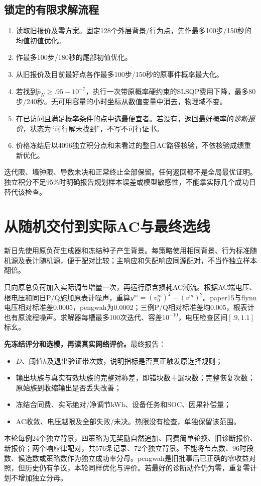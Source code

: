 \documentclass[UTF8,a4paper,11pt]{ctexart}
\begin{document}
\subsection{锁定的有限求解流程}
\begin{enumerate}
 \item 读取旧报价及零方案。固定128个外层背景/行为点，先作最多100步/150秒的均值初值优化。
 \item 作最多100步/180秒的尾部初值优化。
 \item 从旧报价及目前最好点各作最多100步/150秒的原事件概率最大化。
 \item 若找到$\widehat p_N\geq.95-10^{-7}$，执行一次带原概率硬约束的SLSQP费用下降，最多80步/240秒。无可用容量的小时坐标从数值变量中消去，物理域不变。
 \item 在已访问且满足概率条件的点中选最便宜者。若没有，返回最好概率的\emph{诊断报价}，状态为“可行解未找到”，不写不可行证书。
 \item 价格冻结后以4096独立积分点和未看过的整日AC路径核验，不依核验成绩重新优化。
\end{enumerate}
迭代限、墙钟限、导数未决和正常终止全部保留。任何返回都不是全局最优证明。独立积分不足95\%时明确报告规划样本误差或模型敏感性，不能拿实际几个成功日替代该检查。

\section{从随机交付到实际AC与最终选线}
新日先使用原负荷生成器和冻结种子产生背景。每策略使用相同背景、行为标准随机源及表计随机源，便于配对比较；主响应和失配响应同源配对，不当作独立样本翻倍。

只向原总负荷加入实际调节增量一次，再运行原含损耗AC潮流。根据AC端电压、根电压和同日P/Q施加原表计噪声，重算$y^m=(v_0^m)^2-(v^m)^2$。paper15与flynn电压相对标准差0.0005，pengwah为0.0002；三例P/Q相对标准差均0.005，根表计也有原流程噪声。求解器每槽最多100次迭代、容差$10^{-10}$，电压检查区间$[.9,1.1]$标幺。

\textbf{先冻结评分和选模，再读真实网络评价。}最终报告：
\begin{itemize}
 \item $D$、阈值$h$及退出验证带次数，说明指标是否真正触发原选择规则；
 \item 输出块族与真实有效块族的完整对称差，即错块数＋漏块数；完整恢复次数；原始族到收缩输出是否丢失改善；
 \item 冻结合同费、实际绝对/净调节kWh、设备任务和SOC、因果补偿量；
 \item AC收敛、电压越限及全部失败/未决。热限没有检查，单独保留该范围。
\end{itemize}
本轮每例24个独立背景，四策略为无奖励自然追加、同费简单轮换、旧诊断报价、新报价；两个响应律配对，共576条记录、72个独立背景。不能将节点数、96时段数、候选数或策略数作为独立成功率分母。pengwah是旧批事后已正确的零收益对照，但历史仍有争议，本轮同样优化与评价。若最好的诊断动作仍为零，重复零计划不增加独立分母。
\end{document}
